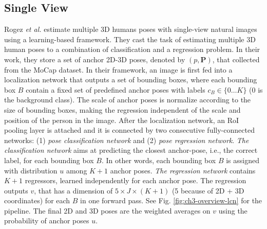 \subsection{Single View}
 Rogez \textit{et al.} \cite{LCR2019} estimate multiple 3D humans poses with single-view natural images using a learning-based framework. They cast the task of estimating multiple 3D human poses to a combination of classification and a regression problem. In their work, they store a set of anchor 2D-3D poses, denoted by $(\mathit{p}, \mathbf{P})$, that collected from the MoCap dataset. In their framework, an image is first fed into a localization network that outputs a set of bounding boxes, where each bounding box $\mathit{B}$ contain a fixed set of predefined anchor poses with labels $\mathit{c_B} \in \{0 \dots K\}$ (0 is the background class). The scale of anchor poses is normalize according to the size of bounding boxes, making the regression independent of the scale and position of the person in the image. After the localization network, an RoI pooling layer is attached and it is connected by two consecutive fully-connected networks: (1) \textit{pose classification network} and (2) \textit{pose regression network}. \textit{The classification network} aims at predicting the closest anchor-pose, i.e., the correct label, for each bounding box $\mathit{B}$. In other words, each bounding box $\mathit{B}$ is assigned with distribution $\mathit{u}$ among $\mathit{K + 1}$ anchor poses. \textit{The regression network} contains $\mathit{K+1}$ regressors, learned independently for each anchor pose. The regression outputs $\mathit{v}$, that has a dimension of $5 \times J \times (K+1)$ (5 because of 2D + 3D coordinates) for each $\mathit{B}$ in one forward pass. See Fig. \ref{fig:ch3-overview-lcn} for the pipeline. The final 2D and 3D poses are the weighted averages on $\mathit{v}$ using the probability of anchor poses $\mathit{u}$.
 
